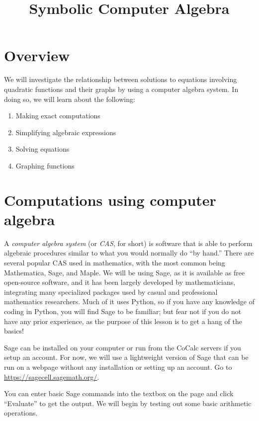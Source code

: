 \documentclass[12pt]{amsart}
\title{Symbolic Computer Algebra}
\theoremstyle{definition}
\theoremstyle{definition}
\begin{document}
\maketitle

\section{Overview}

We will investigate the relationship between solutions to equations
involving quadratic functions and their graphs by using a computer
algebra system. In doing so, we will learn about the following:
\begin{enumerate}
	\item Making exact computations
	\item Simplifying algebraic expressions
	\item Solving equations
	\item Graphing functions
\end{enumerate}

\section{Computations using computer algebra}

A \textit{computer algebra system} (or \textit{CAS}, for short) is software
that is able to perform algebraic procedures similar to what you would
normally do ``by hand.'' There are several popular CAS used in mathematics,
with the most common being Mathematica, Sage, and Maple. We will
be using Sage, as it is available as free open-source software, and it has been
largely developed by mathematicians, integrating many specialized packages
used by casual and professional mathematics researchers. Much of it
uses Python, so if you have any knowledge of coding in Python, you will find
Sage to be familiar; but fear not if you do not have any prior experience,
as the purpose of this lesson is to get a hang of the basics!

Sage can be installed on your computer or run from the CoCalc servers
if you setup an account. For now, we will use a lightweight version of Sage
that can be run on a webpage without any installation or setting up an
account. Go to \url{https://sagecell.sagemath.org/}.

You can enter basic Sage commands into the textbox on the page and
click ``Evaluate'' to get the output. We will begin by testing out some basic
arithmetic operations.
\end{document}
